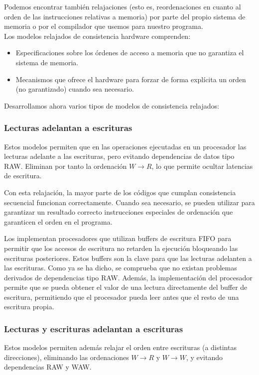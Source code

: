 Podemos encontrar también relajaciones (esto es, reordenaciones en cuanto al orden de las instrucciones relativas a memoria) por parte del propio sistema de memoria o por el compilador que usemos para nuestro programa.\\

Los modelos relajados de consistencia hardware comprenden:
\begin{itemize}
    \item Especificaciones sobre los órdenes de acceso a memoria que no garantiza el sistema de memoria.
    \item Mecanismos que ofrece el hardware para forzar de forma explícita un orden (no garantizado) cuando sea necesario.
\end{itemize}
Desarrollamos ahora varios tipos de modelos de consistencia relajados:

\subsubsection{Lecturas adelantan a escrituras}
Estos modelos permiten que en las operaciones ejecutadas en un procesador las lecturas adelante a las escrituras, pero evitando dependencias de datos tipo RAW\@. Eliminan por tanto la ordenación $W\rightarrow R$, lo que permite ocultar latencias de escritura. 

Con esta relajación, la mayor parte de los códigos que cumplan consistencia secuencial funcionan correctamente. Cuando sea necesario, se pueden utilizar para garantizar un resultado correcto instrucciones especiales de ordenación que garanticen el orden en el programa. 

Los implementan procesadores que utilizan buffers de escritura FIFO para permitir que los accesos de escritura no retarden la ejecución bloqueando las escrituras posteriores. Estos buffers son la clave para que las lecturas adelanten a las escrituras. Como ya se ha dicho, se comprueba que no existan problemas derivados de dependencias tipo RAW\@. Además, la implementación del procesador permite que se pueda obtener el valor de una lectura directamente del buffer de escritura, permitiendo que el procesador pueda leer antes que el resto de una escritura propia.

\subsubsection{Lecturas y escrituras adelantan a escrituras}
Estos modelos permiten además relajar el orden entre escrituras (a distintas direcciones), eliminando las ordenaciones $W\rightarrow R$ y $W\rightarrow W$, y evitando dependencias RAW y WAW.

